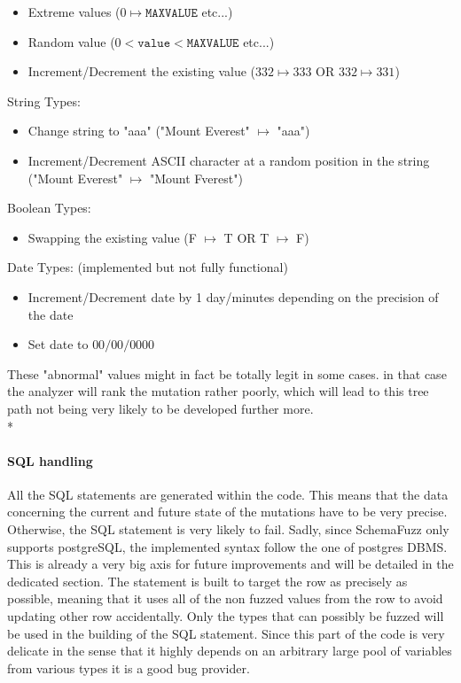 \documentclass{article}
\begin{document}
\begin{empfile}
\begin{itemize}
					\item Extreme values ($0 \mapsto \texttt{MAXVALUE}$ etc...)
					\item Random value ($0<\texttt{value}<\texttt{MAXVALUE}$ etc...)
					\item Increment/Decrement the existing value ($332 \mapsto 333$ OR $332 \mapsto 331$)
				\end{itemize}
				String Types:
				\begin{itemize}
					\item Change string to "aaa" ("Mount Everest" $\mapsto$ "aaa")
					\item Increment/Decrement ASCII character at a random position in the string ("Mount Everest" $\mapsto$ "Mount Fverest")
				\end{itemize}
					Boolean Types:
				\begin{itemize}						
					\item Swapping the existing value (F $\mapsto$ T OR T $\mapsto$ F)
				\end{itemize}
					Date Types: (implemented but not fully functional)			
				\begin{itemize}
					\item Increment/Decrement date by 1 day/minutes depending on the precision of the date
					\item Set date to $00/00/0000$ 
				\end{itemize}
These "abnormal" values might in fact be totally legit in some cases. in that case the analyzer 
will rank the mutation rather poorly, which will lead to this tree path not being very likely to be developed further more.
				\\*
				\paragraph{SQL handling}
All the SQL statements are generated within the code. This means that the data concerning the current and future state of the mutations have to be very precise. Otherwise, the SQL statement is very likely to fail. Sadly, since SchemaFuzz only supports postgreSQL, the implemented syntax follow the one of postgres
DBMS. This is already a very big axis for future improvements and will be detailed in the dedicated section.
The statement is built to target the row as precisely as possible, meaning that it uses all of the non fuzzed values from the row to avoid updating other row accidentally. Only the types that can possibly be fuzzed will be used in the building of the SQL statement. Since this part of the code is very delicate in the sense that it highly depends on an arbitrary large pool of variables from various types it is a good bug provider. 
				

\end{empfile}
\end{document}
